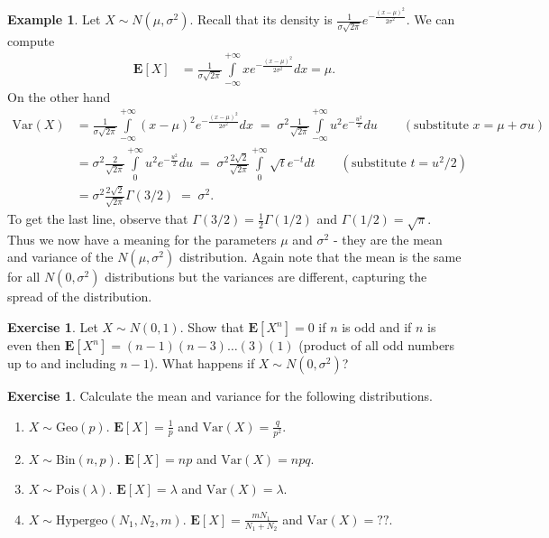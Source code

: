 \documentclass[preprint,  11pt]{amsart}
\theoremstyle{plain} %
\theoremstyle{definition} %
\newtheorem{exercise}[theorem]{Exercise}
\newtheorem{example}[theorem]{Example}
\begin{document}
\begin{example} Let $X\sim N(\mu,{\sigma}^{2})$. Recall that its density is $\frac{1}{{\sigma} \sqrt{2\pi}}e^{-\frac{(x-\mu)^{2}}{2{\sigma}^{2}}}$. We can compute
\begin{align*}
\mathbf{E}[X] &=\frac{1}{{\sigma} \sqrt{2\pi}}\int\limits_{-\infty}^{+\infty}xe^{-\frac{(x-\mu)^{2}}{2{\sigma}^{2}}} dx =\mu.
\end{align*}
On the other hand
\begin{align*}
\mbox{Var}(X) &= \frac{1}{{\sigma} \sqrt{2\pi}}\int\limits_{-\infty}^{+\infty}(x-\mu)^{2}e^{-\frac{(x-\mu)^{2}}{2{\sigma}^{2}}} dx \; = \; {\sigma}^{2}\frac{1}{\sqrt{2\pi}} \int\limits_{-\infty}^{+\infty}u^{2}e^{-\frac{u^{2}}{2}} du \qquad (\mbox{substitute }x  = \mu+{\sigma} u) \\
&= {\sigma}^{2}\frac{2}{\sqrt{2\pi}} \int\limits_{0}^{+\infty}u^{2}e^{-\frac{u^{2}}{2}} du \; = \; {\sigma}^{2}\frac{2\sqrt{2}}{\sqrt{2\pi}} \int\limits_{0}^{+\infty}\sqrt{t}e^{-t} dt \qquad (\mbox{substitute }t=u^{2}/2) \\
&= {\sigma}^{2}\frac{2\sqrt{2}}{\sqrt{2\pi}}\Gamma(3/2) \; =\; {\sigma}^{2}.
\end{align*}
To get the last line, observe that $\Gamma(3/2)=\frac{1}{2}\Gamma(1/2)$ and $\Gamma(1/2)=\sqrt{\pi}$. Thus we now have a meaning for the parameters $\mu$ and ${\sigma}^{2}$ - they are the mean and variance of the $N(\mu,{\sigma}^{2})$ distribution. Again note that the mean is the same for all $N(0,{\sigma}^{2})$ distributions but the variances are different, capturing the spread of the distribution.
\end{example}
\begin{exercise} Let $X\sim N(0,1)$. Show that $\mathbf{E}[X^{n}]=0$ if $n$ is odd and if $n$ is even then $\mathbf{E}[X^{n}]=(n-1)(n-3)\ldots (3)(1)$ (product of all odd numbers up to and including $n-1$). What happens if $X\sim N(0,{\sigma}^{2})$?
\end{exercise}



\begin{exercise} Calculate the mean and variance for the following distributions. 
\begin{enumerate}\setlength\itemsep{6pt}
\item $X\sim \mbox{Geo}(p)$. $\mathbf{E}[X]=\frac{1}{p}$ and $\mbox{Var}(X)=\frac{q}{p^{2}}$.
\item $X\sim \mbox{Bin}(n,p)$. $\mathbf{E}[X]=np$ and $\mbox{Var}(X)=npq$.
\item $X\sim \mbox{Pois}(\lambda)$. $\mathbf{E}[X]=\lambda$ and $\mbox{Var}(X)=\lambda$.
\item $X\sim \mbox{Hypergeo}(N_{1},N_{2},m)$. $\mathbf{E}[X]=\frac{mN_{1}}{N_{1}+N_{2}}$ and $\mbox{Var}(X)=??$.
\end{enumerate}
\end{exercise}
\end{document}
